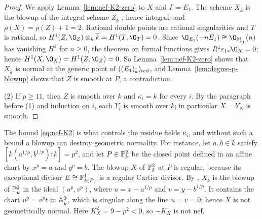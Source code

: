 \begin{proof}
We apply Lemma~\ref{lem:nef-K2-zero} to $X$ and $\Gamma = E_1$.
The scheme $X_{\bar k}$ is the blowup of the integral scheme $Z_{\bar k}$ \cite[Tag~]{Stacks}, hence integral, and $\rho(X) = \rho(Z)+1 = 2$.
Rational double points are rational singularities \cite[Corollary~2.30(2)]{Kol13} and $T$ is rational, so $H^1(Z,\O_Z)\otimes_k\overline k = H^1(T,\O_T) = 0$.
Since $\O_{E_1}(-nE_1)\cong\O_{\PP^1_{\kappa_1}}(n)$ has vanishing $H^1$ for $n\geq 0$, the theorem on formal functions \cite[III, Theorem~11.1]{Har77} gives $R^1\varepsilon_{1*}\O_X = 0$; hence $H^1(X,\O_X) = H^1(Z,\O_Z) = 0$.
So Lemma~\ref{lem:nef-K2-zero} shows that $X_{\bar k}$ is normal at the generic point of $((E_1)_{\bar k})_{\rm red}$, and Lemma~\ref{lem:degree-p-blowup} shows that $Z$ is smooth at $P$, a contradiction.

(2) If $p\geq 11$, then $Z$ is smooth over $k$ and $\kappa_i = k$ for every $i$.
By the paragraph before \textup{(1)} and induction on $i$, each $Y_i$ is smooth over $k$; in particular $X = Y_N$ is smooth.
\end{proof}

\begin{remark}\label{rem:nef-blowup}
The bound \eqref{eq:nef-K2} is what controls the residue fields $\kappa_i$, and without such a bound a blowup can destroy geometric normality.
For instance, let $a,b\in k$ satisfy $[k(a^{1/p},b^{1/p}):k] = p^2$, and let $P\in\PP^2_k$ be the closed point defined in an affine chart by $x^p = a$ and $y^p = b$.
The blowup $X$ of $\PP^2_k$ at $P$ is regular, because its exceptional divisor $E\cong\PP^1_{k(P)}$ is a regular Cartier divisor.
By \cite[Tag~]{Stacks}, $X_{\bar k}$ is the blowup of $\PP^2_{\bar k}$ in the ideal $(u^p,v^p)$, where $u = x-a^{1/p}$ and $v = y-b^{1/p}$.
It contains the chart $u^p = v^pt$ in $\AA^3_{\bar k}$, which is singular along the line $u = v = 0$; hence $X$ is not geometrically normal.
Here $K_X^2 = 9-p^2<0$, so $-K_X$ is not nef.
\end{remark}
